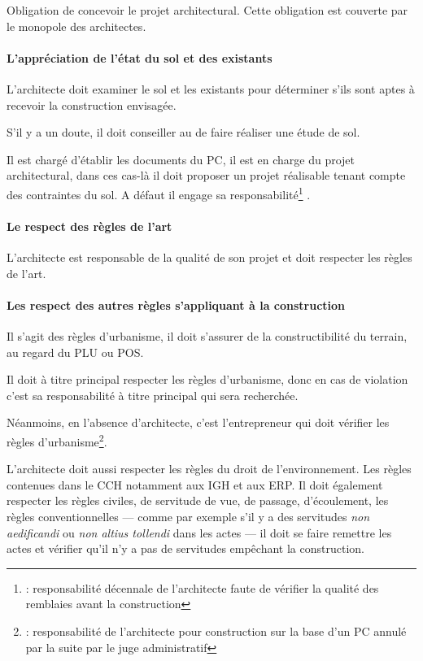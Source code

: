 			Obligation de concevoir le projet architectural. Cette obligation est couverte par le monopole des architectes.

			\paragraph{L'appréciation de l'état du sol et des existants} L’architecte doit examiner le sol et les existants pour déterminer s’ils sont aptes à recevoir la construction envisagée.


			S’il y a un doute, il doit conseiller au \Mo de faire réaliser une étude de sol.

			Il est chargé d’établir les documents du PC, il est en charge du projet architectural, dans ces cas-là il doit proposer un projet réalisable tenant compte des contraintes du sol. A défaut il engage sa responsabilité\footnote{  : responsabilité décennale de l’architecte faute de vérifier la qualité des remblaies avant la construction}
.


			\paragraph{Le respect des règles de l'art} L’architecte est responsable de la qualité de son projet et doit respecter les règles de l’art.

			\paragraph{Les respect des autres règles s'appliquant à la construction} Il s’agit des règles d’urbanisme, il doit s’assurer de la constructibilité du terrain, au regard du PLU ou POS.


			Il doit à titre principal respecter les règles d’urbanisme, donc en cas de violation c’est sa responsabilité à titre principal qui sera recherchée.

			Néanmoins, en l’absence d’architecte, c’est l’entrepreneur qui doit vérifier les règles d’urbanisme\footnote{ : responsabilité de l’architecte pour construction sur la base d’un PC annulé par la suite par le juge administratif}.

			L’architecte doit aussi respecter les règles du droit de l’environnement. Les règles contenues dans le CCH notamment aux IGH et aux ERP. Il doit également respecter les règles civiles, de servitude de vue, de passage, d’écoulement, les règles conventionnelles --- comme par exemple s’il y a des servitudes \emph{non aedificandi} ou \emph{non altius tollendi} dans les actes --- il doit se faire remettre les actes et vérifier qu’il n’y a pas de servitudes empêchant la construction.



